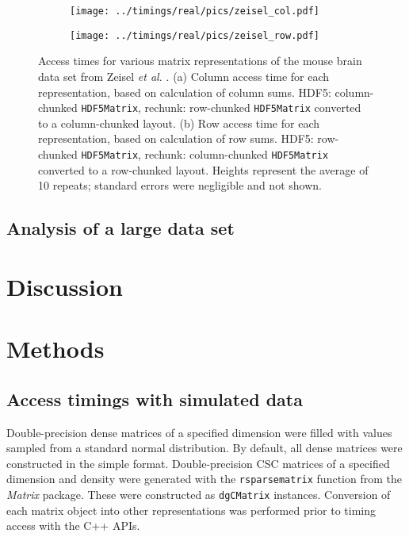\documentclass[10pt,letterpaper]{article}
\newcommand{\code}[1]{\texttt{#1}}
\begin{document}
\begin{figure}[bt]
    \begin{subfigure}[b]{0.49\textwidth}
        \texttt{[image: ../timings/real/pics/zeisel\_col.pdf]}
        \caption{}
    \end{subfigure}
    \begin{subfigure}[b]{0.49\textwidth}
        \texttt{[image: ../timings/real/pics/zeisel\_row.pdf]}
        \caption{}
    \end{subfigure}
    \caption{Access times for various matrix representations of the mouse brain data set from Zeisel \textit{et al.} \cite{zeisel2015brain}.
        (a) Column access time for each representation, based on calculation of column sums.
        HDF5: column-chunked \code{HDF5Matrix},
        rechunk: row-chunked \code{HDF5Matrix} converted to a column-chunked layout.
        (b) Row access time for each representation, based on calculation of row sums.
        HDF5: row-chunked \code{HDF5Matrix},
        rechunk: column-chunked \code{HDF5Matrix} converted to a row-chunked layout.
        Heights represent the average of 10 repeats; standard errors were negligible and not shown.
    }
    \label{fig:zeisel}
\end{figure}

\subsection*{Analysis of a large data set}

\section*{Discussion}

\section*{Methods}

\subsection*{Access timings with simulated data}
Double-precision dense matrices of a specified dimension were filled with values sampled from a standard normal distribution.
By default, all dense matrices were constructed in the simple format.
Double-precision CSC matrices of a specified dimension and density were generated with the \code{rsparsematrix} function from the \textit{Matrix} package. 
These were constructed as \code{dgCMatrix} instances.
Conversion of each matrix object into other representations was performed prior to timing access with the C++ APIs.
\end{document}
